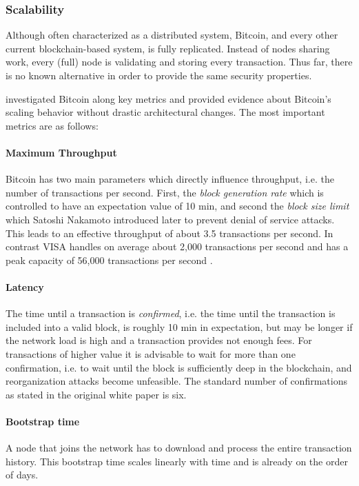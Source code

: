 \subsubsection{Scalability}

Although often characterized as a distributed system, Bitcoin, and every other current blockchain-based system, is fully replicated. Instead of nodes sharing work, every (full) node is validating and storing every transaction. Thus far, there is no known alternative in order to provide the same security properties.

\cite{croman2016scaling} investigated Bitcoin along key metrics and provided evidence about Bitcoin's scaling behavior without drastic architectural changes.
The most important metrics are as follows:
\paragraph{Maximum Throughput} 
Bitcoin has two main parameters which directly influence throughput, i.e. the number of transactions per second. First, the \emph{block generation rate} which is controlled to have an expectation value of 10 min, and second the \emph{block size limit} which Satoshi Nakamoto introduced later to prevent denial of service attacks. This leads to an effective throughput of about 3.5 transactions per second. In contrast VISA handles on average about 2,000 transactions per second and has a peak capacity of 56,000 transactions per second \parencite{visa}. 
\paragraph{Latency} The time until a transaction is \emph{confirmed}, i.e. the time until the transaction is included into a valid block, is roughly 10 min in expectation, but may be longer if the network load is high and a transaction provides not enough fees. For transactions of higher value it is advisable to wait for more than one confirmation, i.e. to wait until the block is sufficiently deep in the blockchain, and reorganization attacks become unfeasible. The standard number of confirmations as stated in the original white paper is six. 
\paragraph{Bootstrap time} A node that joins the network has to download and process the entire transaction history. This bootstrap time scales linearly with time and is already on the order of days.


